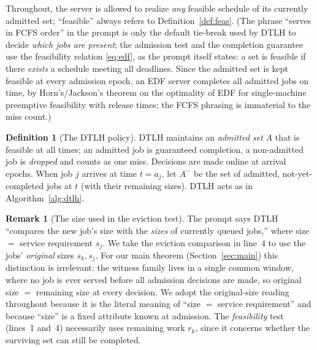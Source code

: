 \documentclass{amsart}
\theoremstyle{definition}
\newtheorem{definition}[theorem]{Definition}
\newtheorem{remark}[theorem]{Remark}
\begin{document}
Throughout, the server is allowed to realize \emph{any} feasible schedule of its
currently admitted set; ``feasible'' always refers to
Definition~\ref{def:feas}. (The phrase ``serves in FCFS order'' in the prompt is
only the default tie-break used by DTLH to decide \emph{which jobs are present};
the admission test and the completion guarantee use the feasibility relation
\eqref{eq:edf}, as the prompt itself states: a set is feasible if there
\emph{exists} a schedule meeting all deadlines. Since the admitted set is kept
feasible at every admission epoch, an EDF server completes all admitted jobs on
time, by Horn's/Jackson's theorem on the optimality of EDF for single-machine
preemptive feasibility with release times; the FCFS phrasing is immaterial to
the miss count.)

\begin{definition}[The DTLH policy]\label{def:dtlh}
DTLH maintains an \emph{admitted set} $A$ that is feasible at all times; an
admitted job is guaranteed completion, a non-admitted job is \emph{dropped} and
counts as one miss. Decisions are made online at arrival epochs. When job $j$
arrives at time $t=a_j$, let $A^-$ be the set of admitted, not-yet-completed
jobs at $t$ (with their remaining sizes). DTLH acts as in
Algorithm~\ref{alg:dtlh}.
\end{definition}

\begin{remark}[The size used in the eviction test]\label{rem:sizeconv}
The prompt says DTLH ``compares the new job's size with the \emph{sizes} of
currently queued jobs,'' where size $=$ service requirement $s_j$. We take the
eviction comparison in line~4 to use the jobs' \emph{original} sizes $s_k,s_j$.
For our main theorem (Section~\ref{sec:main}) this distinction is irrelevant:
the witness family lives in a single common window, where no job is ever served
before all admission decisions are made, so original size $=$ remaining size at
every decision. We adopt the original-size reading throughout because it is the
literal meaning of ``size $=$ service requirement'' and because ``size'' is a
fixed attribute known at admission. The \emph{feasibility} test (lines~1 and~4)
necessarily uses remaining work $r_k$, since it concerns whether the surviving
set can still be completed.
\end{remark}
\end{document}
